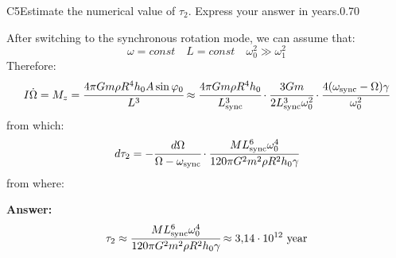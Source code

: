 \documentclass[11pt,a4paper]{article}
\begin{document}
\begin{solcard}{C5}{Estimate the numerical value of $\tau_2$. Express your answer in years.}{0.70}

After switching to the synchronous rotation mode, we can assume that: $$\omega=const\quad L=const\quad \omega^2_0\gg\omega^2_1 $$ Therefore: $$I\dot{\Omega}=M_z=\cfrac{4\pi Gm\rho R^4h_0A\sin\varphi_0}{L^3}\approx\cfrac{4\pi Gm\rho{R}^4h_0}{L^3_\text{sync}}\cdot{\cfrac{3Gm}{2L^3_\text{sync}\omega^2_0}}\cdot\cfrac{4(\omega_\text{sync}-\Omega)\gamma}{\omega^2_0} $$ from which: $$d\tau_2=-\cfrac{d\Omega}{\Omega-\omega_\text{sync}}\cdot{\cfrac{ML^6_\text{sync}\omega^4_0}{120\pi G^2m^2\rho{R}^2h_0\gamma}} $$ from where:

\par\smallskip\noindent\textbf{Answer:} $$\tau_2\approx\cfrac{ML^6_\text{sync}\omega^4_0}{120\pi G^2m^2\rho{R}^2h_0\gamma}\approx 3{,}14\cdot{10^{12}}~\text{year} $$
\end{solcard}
\end{document}

